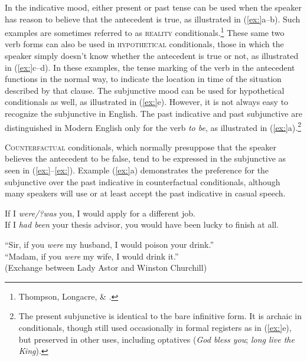 In the indicative mood, either present or past tense can be used when the speaker has reason to believe that the antecedent is true, as illustrated in (\ref{ex:}a--b). Such examples are sometimes referred to as \textsc{reality} conditionals.\footnote{Thompson, Longacre, \& \citet{Hwang2007}.} These same two verb forms can also be used in \textsc{hypothetical} conditionals, those in which the speaker simply doesn’t know whether the antecedent is true or not, as illustrated in (\ref{ex:}c--d). In these examples, the tense marking of the verb in the antecedent functions in the normal way, to indicate the location in time of the situation described by that clause. The subjunctive mood can be used for hypothetical conditionals as well, as illustrated in (\ref{ex:}e). However, it is not always easy to recognize the subjunctive in English. The past indicative and past subjunctive are distinguished in Modern English only for the verb \textit{to be}, as illustrated in (\ref{ex:}a).\footnote{The present subjunctive is identical to the bare infinitive form. It is archaic in conditionals, though still used occasionally in formal registers as in (\ref{ex:}e), but preserved in other uses, including optatives (\textit{God bless you}; \textit{long live the King}).}



\textsc{Counterfactual} conditionals, which normally presuppose that the speaker believes the antecedent to be false, tend to be expressed in the subjunctive as seen in (\ref{ex:}--\ref{ex:}). Example (\ref{ex:}a) demonstrates the preference for the subjunctive over the past indicative in counterfactual conditionals, although many speakers will use or at least accept the past indicative in casual speech.


\ea
\ea If I \textit{were/?was} you, I would apply for a different job.\\
\ex If I \textit{had been} your thesis advisor, you would have been lucky to finish at all.
                       \z
\z

\ea
“Sir, if you \textit{were} my husband, I would poison your drink.”\\
“Madam, if you \textit{were} my wife, I would drink it.”\\
  (Exchange between Lady Astor and Winston Churchill)
\z


